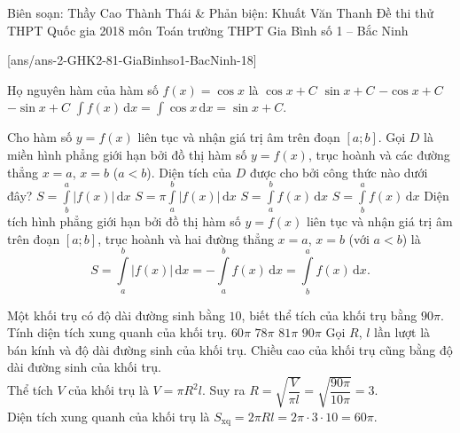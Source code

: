 
\begin{name}
{Biên soạn: Thầy Cao Thành Thái \& Phản biện: Khuất Văn Thanh}
{Đề thi thử THPT Quốc gia 2018 môn Toán trường THPT Gia Bình số 1 – Bắc Ninh}
\end{name}
\setcounter{ex}{0}\setcounter{bt}{0}
[ans/ans-2-GHK2-81-GiaBinhso1-BacNinh-18]


\begin{ex}%
 Họ nguyên hàm của hàm số $f(x) = \cos x$ là
 \choice
  {$\cos x + C$}
  {\True $\sin x + C$}
  {$-\cos x + C$}
  {$-\sin x + C$}
 \loigiai
  {
  $\displaystyle\int f(x) \mathrm{\,d}x = \displaystyle\int \cos x \mathrm{\,d}x = \sin x + C$.
  }
\end{ex}


\begin{ex}%
 Cho hàm số $y = f(x)$ liên tục và nhận giá trị âm trên đoạn $[a;b]$. Gọi $D$ là miền hình phẳng giới hạn bởi đồ thị hàm số $y = f(x)$, trục hoành và các đường thẳng $x = a$, $x = b$ ($a<b$). Diện tích của $D$ được cho bởi công thức nào dưới đây?
 \choice
  {$S = \displaystyle\int\limits_b^a |f(x)| \mathrm{\,d}x$}
  {$S = \pi \displaystyle\int\limits_a^b |f(x)| \mathrm{\,d}x$}
  {$S = \displaystyle\int\limits_a^b f(x) \mathrm{\,d}x$}
  {\True $S = \displaystyle\int\limits_b^a f(x) \mathrm{\,d}x$}
 \loigiai
  {
  Diện tích hình phẳng giới hạn bởi đồ thị hàm số $y = f(x)$ liên tục và nhận giá trị âm trên đoạn $[a;b]$, trục hoành và hai đường thẳng $x = a$, $x = b$ (với $a < b$) là
  $$S = \displaystyle\int\limits_{a}^{b} \left| f(x) \right| \mathrm{\,d}x = -\displaystyle\int\limits_{a}^{b} f(x) \mathrm{\,d}x = \displaystyle\int\limits_{b}^{a} f(x) \mathrm{\,d}x.$$
  }
\end{ex}


\begin{ex}%
 Một khối trụ có độ dài đường sinh bằng $10$, biết thể tích của khối trụ bằng $90\pi$. Tính diện tích xung quanh của khối trụ.
 \choice
  {\True $60\pi$}
  {$78\pi$}
  {$81\pi$}
  {$90\pi$}
 \loigiai
  {
  Gọi $R$, $l$ lần lượt là bán kính và độ dài đường sinh của khối trụ. Chiều cao của khối trụ cũng bằng độ dài đường sinh của khối trụ.\\
  Thể tích $V$ của khối trụ là $V = \pi R^2 l$. Suy ra $R = \sqrt{\dfrac{V}{\pi l}} = \sqrt{\dfrac{90\pi}{10\pi}} = 3$.\\
  Diện tích xung quanh của khối trụ là $S_{\mathrm{xq}} = 2\pi R l = 2\pi \cdot 3 \cdot 10 = 60\pi$.
  }
\end{ex}


